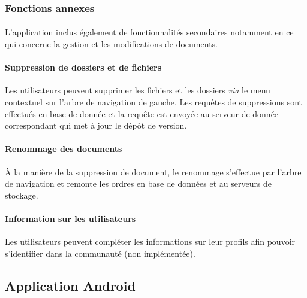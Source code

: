 \documentclass[a4paper,12pt]{article}
\begin{document}
\subsubsection{Fonctions annexes}
\paragraph*{}
L'application inclus également de fonctionnalités secondaires notamment en ce qui concerne la gestion et les modifications de documents.

\paragraph{Suppression de dossiers et de fichiers\\}
Les utilisateurs peuvent supprimer les fichiers et les dossiers \emph{via} le menu contextuel sur l'arbre de navigation de gauche.
Les requêtes de suppressions sont effectués en base de donnée et la requête est envoyée au serveur de donnée correspondant qui met à jour le dépôt de version.

\paragraph{Renommage des documents\\}
\`A la manière de la suppression de document, le renommage s'effectue par l'arbre de navigation et remonte les ordres en base de données et au serveurs de stockage.

\paragraph{Information sur les utilisateurs\\}
Les utilisateurs peuvent compléter les informations sur leur profils afin pouvoir s'identifier dans la communauté (non implémentée).

\subsection{Application Android}
\end{document}
